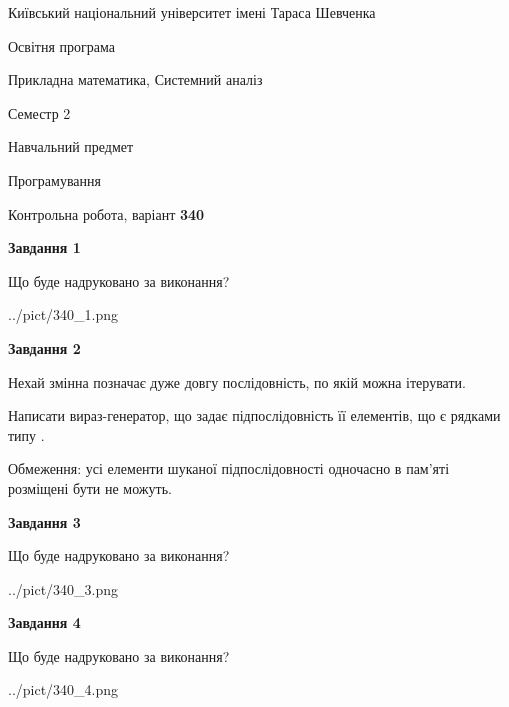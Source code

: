 \documentclass[12pt, ukrainian]{article}
\begin{document}
{{\begin {small}\par
{ \center  Київський національний університет імені Тараса Шевченка \par}
{\parbox {5 cm}{Освітня програма \hfill}{\parbox {8 cm}{Прикладна математика, Системний аналіз \hfill}}\parbox {5 cm}{\hfill Семестр 2}}\par
{\parbox {5 cm} {Навчальний предмет \hfill}\parbox {7 cm}{Програмування \hfill}\parbox {6cm}{\hfill}\par}\vspace{-7pt} \end{small}}{\center Контрольна робота, варіант  \No \textbf
{ 340 }\par}}
{
\begin {large}
{\begin {center}\textbf{Завдання 1}\end {center}}\par
Що буде надруковано за виконання?\par\par
\begin{center}
	{../pict/340_1.png}
\end{center}
\newpage

{\begin {center}\textbf{Завдання 2}\end {center}}\par
Нехай змінна  позначає дуже довгу послідовність, по якій можна ітерувати.

Написати вираз-генератор, що задає підпослідовність її елементів, що є рядками типу .

Обмеження: усі елементи шуканої підпослідовності одночасно в пам'яті розміщені бути не можуть.\par
\newpage

{\begin {center}\textbf{Завдання 3}\end {center}}\par
Що буде надруковано за виконання?
\begin{center}
	{../pict/340_3.png}
\end{center}
\newpage

{\begin {center}\textbf{Завдання 4}\end {center}}\par
Що буде надруковано за виконання?\par
\begin{center}
	{../pict/340_4.png}
\end{center}
\newpage


\end{large}}
\end{document}
